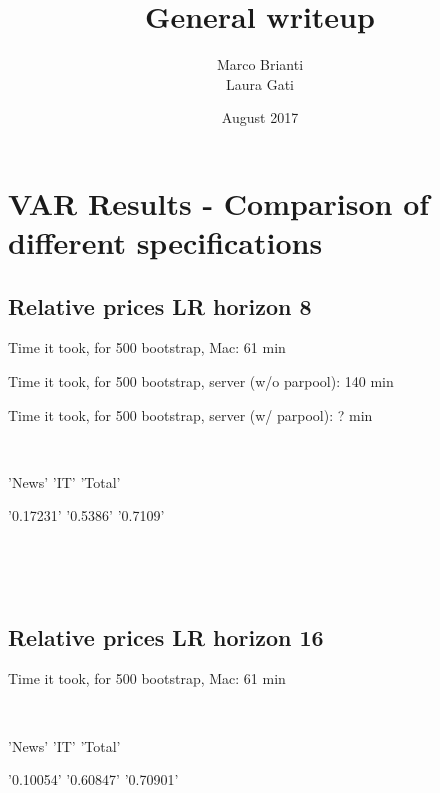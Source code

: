 \documentclass{article}
\title{General writeup}
\author{Marco Brianti\\Laura Gati}
\date{August 2017}
\def \ourFigPath {../../}
\begin{document}
	
	\maketitle
	
	\section{VAR Results - Comparison of different specifications}
	
	\subsection{Relative prices LR horizon 8}
	\noindent Time it took, for 500 bootstrap, Mac: 61 min
	
	\noindent  Time it took, for 500 bootstrap, server (w/o parpool): 140 min
	
	\noindent  Time it took, for 500 bootstrap, server (w/ parpool): ? min
	
	\
	
	\noindent  'News'       'IT'        'Total' 
	
         \noindent  '0.17231'    '0.5386'    '0.7109'
         
         
         \
         
         
         
         \

\begin{figure}[h!]
\centering
{} \hspace{.2in%
} 
\end{figure}
 
\newpage
\subsection{Relative prices LR horizon 16}
	\noindent Time it took, for 500 bootstrap, Mac: 61 min
	
	\
	
	\noindent  'News'       'IT'        'Total' 
	
         \noindent  '0.10054'    '0.60847'    '0.70901'
         
         \
         
\end{document}
